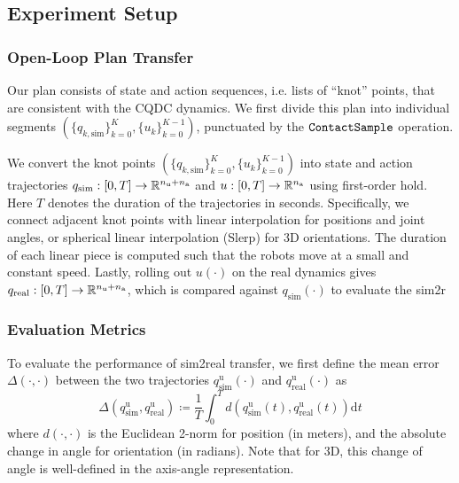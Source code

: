 \subsection{Experiment Setup}
\subsubsection{Open-Loop Plan Transfer}
\newcommand{\qsimcoarse}{\{q_{k,\mathrm{sim}}\}^K_{k=0}}
\newcommand{\qsimfine}{\{q_{t,\mathrm{sim}}\}^T_{t=0}}
\newcommand{\ucoarse}{\{u_k\}^{K-1}_{k=0}}

\newcommand{\qsimp}{q_{\mathrm{sim}}}
\newcommand{\qrealp}{q_{\mathrm{real}}}
\newcommand{\qusimp}{q^\mathrm{u}_{\mathrm{sim}}}
\newcommand{\qurealp}{q^\mathrm{u}_{\mathrm{real}}}

Our plan consists of state and action sequences, i.e. lists of ``knot'' points, that are consistent with the CQDC dynamics. We first divide this plan into individual segments $\left(\qsimcoarse, \ucoarse \right)$, punctuated by the $\ContactSample$ operation. 

We convert the knot points $(\qsimcoarse, \ucoarse)$ into state and action trajectories $q_\mathrm{sim}: [0, T] \rightarrow \R[\nU + \nA]$ and $u: [0, T] \rightarrow \R[\nA]$ using first-order hold. Here $T$ denotes the duration of the trajectories in seconds. Specifically, we connect adjacent knot points with linear interpolation for positions and joint angles, or spherical linear interpolation (Slerp) for 3D orientations. The duration of each linear piece is computed such that the robots move at a small and constant speed. Lastly, rolling out $u(\cdot)$ on the real dynamics gives $q_\mathrm{real}: [0, T] \rightarrow \R[\nU + \nA]$, which is compared against $q_\mathrm{sim}(\cdot)$ to evaluate the sim2r

\subsubsection{Evaluation Metrics}
To evaluate the performance of sim2real transfer, we first define the mean error $\Delta(\cdot,\cdot)$ between the two trajectories $q_\mathrm{sim}^\mathrm{u}(\cdot)$ and $q_\mathrm{real}^\mathrm{u}(\cdot)$ as
\begin{equation}
\Delta(q_\mathrm{sim}^\mathrm{u}, q_\mathrm{real}^\mathrm{u}) \coloneqq 
\frac{1}{T}
\int^T_{0} d\left(q_\mathrm{sim}^\mathrm{u}(t), q_\mathrm{real}^\mathrm{u}(t)\right) \mathrm{d}t
\end{equation}
where $d(\cdot,\cdot)$ is the Euclidean 2-norm for position (in meters), and the absolute change in angle for orientation (in radians). Note that for 3D, this change of angle is well-defined in the axis-angle representation. 

